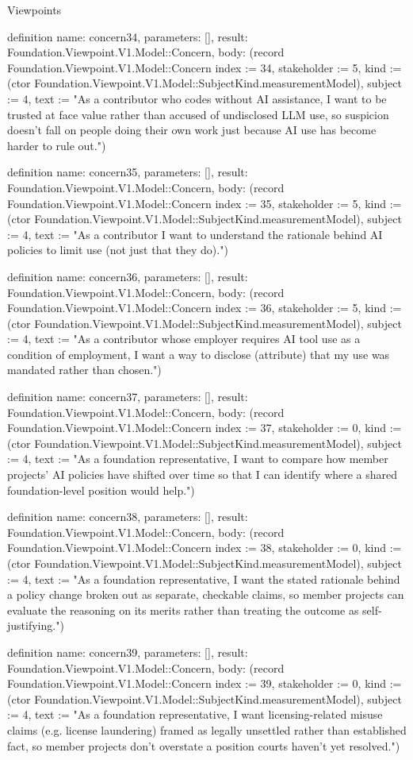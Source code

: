 \begin{lexlean}{Viewpoints}
\begin{semanticmodule}
definition{
  name: concern34,
  parameters: [],
  result: Foundation.Viewpoint.V1.Model::Concern,
  body: (record Foundation.Viewpoint.V1.Model::Concern {index := 34, stakeholder := 5, kind := (ctor Foundation.Viewpoint.V1.Model::SubjectKind.measurementModel), subject := 4, text := "As a contributor who codes without AI assistance, I want to be trusted at face value rather than accused of undisclosed LLM use, so suspicion doesn't fall on people doing their own work just because AI use has become harder to rule out."})
}

definition{
  name: concern35,
  parameters: [],
  result: Foundation.Viewpoint.V1.Model::Concern,
  body: (record Foundation.Viewpoint.V1.Model::Concern {index := 35, stakeholder := 5, kind := (ctor Foundation.Viewpoint.V1.Model::SubjectKind.measurementModel), subject := 4, text := "As a contributor I want to understand the rationale behind AI policies to limit use (not just that they do)."})
}

definition{
  name: concern36,
  parameters: [],
  result: Foundation.Viewpoint.V1.Model::Concern,
  body: (record Foundation.Viewpoint.V1.Model::Concern {index := 36, stakeholder := 5, kind := (ctor Foundation.Viewpoint.V1.Model::SubjectKind.measurementModel), subject := 4, text := "As a contributor whose employer requires AI tool use as a condition of employment, I want a way to disclose (attribute) that my use was mandated rather than chosen."})
}

definition{
  name: concern37,
  parameters: [],
  result: Foundation.Viewpoint.V1.Model::Concern,
  body: (record Foundation.Viewpoint.V1.Model::Concern {index := 37, stakeholder := 0, kind := (ctor Foundation.Viewpoint.V1.Model::SubjectKind.measurementModel), subject := 4, text := "As a foundation representative, I want to compare how member projects' AI policies have shifted over time so that I can identify where a shared foundation-level position would help."})
}

definition{
  name: concern38,
  parameters: [],
  result: Foundation.Viewpoint.V1.Model::Concern,
  body: (record Foundation.Viewpoint.V1.Model::Concern {index := 38, stakeholder := 0, kind := (ctor Foundation.Viewpoint.V1.Model::SubjectKind.measurementModel), subject := 4, text := "As a foundation representative, I want the stated rationale behind a policy change broken out as separate, checkable claims, so member projects can evaluate the reasoning on its merits rather than treating the outcome as self-justifying."})
}

definition{
  name: concern39,
  parameters: [],
  result: Foundation.Viewpoint.V1.Model::Concern,
  body: (record Foundation.Viewpoint.V1.Model::Concern {index := 39, stakeholder := 0, kind := (ctor Foundation.Viewpoint.V1.Model::SubjectKind.measurementModel), subject := 4, text := "As a foundation representative, I want licensing-related misuse claims (e.g. license laundering) framed as legally unsettled rather than established fact, so member projects don't overstate a position courts haven't yet resolved."})
}


\end{semanticmodule}
\end{lexlean}
